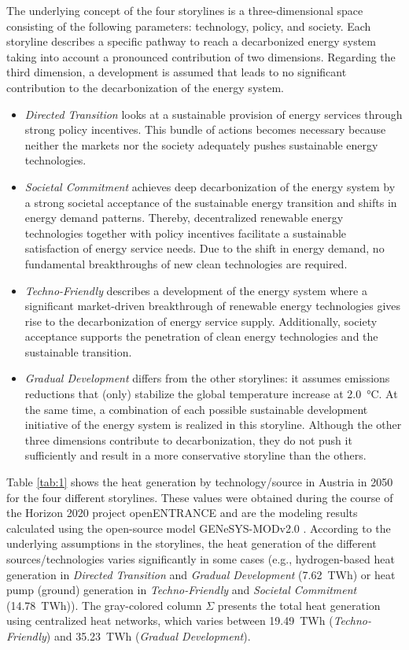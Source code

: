 The underlying concept of the four storylines is a three-dimensional space consisting of the following parameters: technology, policy, and society. Each storyline describes a specific pathway to reach a decarbonized energy system taking into account a pronounced contribution of two dimensions. Regarding the third dimension, a development is assumed that leads to no significant contribution to the decarbonization of the energy system. 

\begin{itemize}
	\item \textit{Directed Transition} looks at a sustainable provision of energy services through strong policy incentives. This bundle of actions becomes necessary because neither the markets nor the society adequately pushes sustainable energy technologies.
	\item \textit{Societal Commitment} achieves deep decarbonization of the energy system by a strong societal acceptance of the sustainable energy transition and shifts in energy demand patterns. Thereby, decentralized renewable energy technologies together with policy incentives facilitate a sustainable satisfaction of energy service needs. Due to the shift in energy demand, no fundamental breakthroughs of new clean technologies are required.
	\item \textit{Techno-Friendly} describes a development of the energy system where a significant market-driven breakthrough of renewable energy technologies gives rise to the decarbonization of energy service supply. Additionally, society acceptance supports the penetration of clean energy technologies and the sustainable transition.
	\item \textit{Gradual Development} differs from the other storylines: it assumes emissions reductions that (only) stabilize the global temperature increase at \SI{2.0}{\degreeCelsius}. At the same time, a combination of each possible sustainable development initiative of the energy system is realized in this storyline. Although the other three dimensions contribute to decarbonization, they do not push it sufficiently and result in a more conservative storyline than the others.
\end{itemize}

Table \ref{tab:1} shows the heat generation by technology/source in Austria in 2050 for the four different storylines. These values were obtained during the course of the Horizon 2020 project openENTRANCE and are the modeling results calculated using the open-source model GENeSYS-MODv2.0 \cite{burandt2018genesys}. According to the underlying assumptions in the storylines, the heat generation of the different sources/technologies varies significantly in some cases (e.g., hydrogen-based heat generation in \textit{Directed Transition} and \textit{Gradual Development} (\SI{7.62}{TWh}) or heat pump (ground) generation in \textit{Techno-Friendly} and \textit{Societal Commitment} (\SI{14.78}{TWh})). The gray-colored column $\Sigma$ presents the total heat generation using centralized heat networks, which varies between \SI{19.49}{TWh} (\textit{Techno-Friendly}) and \SI{35.23}{TWh} (\textit{Gradual Development}).

